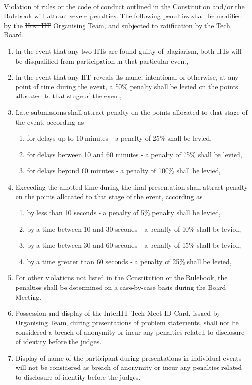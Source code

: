 
\paragraph{}
Violation of rules or the code of conduct outlined in the Constitution and/or the Rulebook will attract severe penalties. The following penalties shall be modified by the \st{Host IIT} Organising Team, and subjected to ratification by the Tech Board.
\begin{enumerate}
    \item In the event that any two IITs are found guilty of plagiarism, both IITs will be disqualified from participation in that particular event,
    \item In the event that any IIT reveals its name, intentional or otherwise, at any point of time during the event, a 50\% penalty shall be levied on the points allocated to that stage of the event,
    \item Late submissions shall attract penalty on the points allocated to that stage of the event, according as
    \begin{enumerate}
        \item for delays up to 10 minutes - a penalty of 25\% shall be levied,
        \item for delays between 10 and 60 minutes - a penalty of 75\% shall be levied,
        \item for delays beyond 60 minutes - a penalty of 100\% shall be levied,
    \end{enumerate}
    \item Exceeding the allotted time during the final presentation shall attract penalty on the points allocated to that stage of the event, according as
    \begin{enumerate}
        \item by less than 10 seconds - a penalty of 5\% penalty shall be levied,
        \item by a time between 10 and 30 seconds - a penalty of 10\% shall be levied,
        \item by a time between 30 and 60 seconds - a penalty of 15\% shall be levied,
        \item by a time greater than 60 seconds - a penalty of 25\% shall be levied,
    \end{enumerate}
    \item For other violations not listed in the Constitution or the Rulebook, the penalties shall be determined on a case-by-case basis during the Board Meeting.
    \item Possession and display of the InterIIT Tech Meet ID Card, issued by Organising Team, during presentations of problem statements, shall not be considered a breach of anonymity or incur any penalties related to disclosure of identity before the judges. 
    \item Display of name of the participant during presentations in individual events will not be considered as breach of anonymity or incur any penalties related to disclosure of identity before the judges. 
\end{enumerate}
